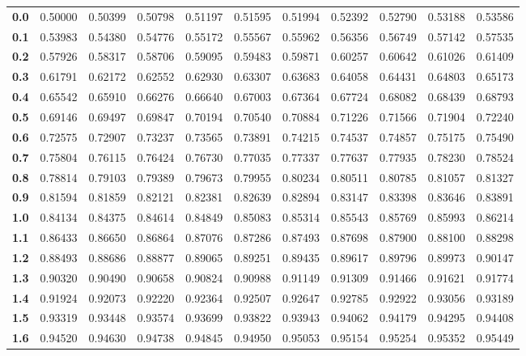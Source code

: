 \documentclass[12pt,a4paper]{article}
\begin{document}
\begin{enumerate}
\begin{center}
\begin{longtable}{c | cccccccccc}
\bottomrule
\endlastfoot
\textbf{0.0} & 0.50000 & 0.50399 & 0.50798 & 0.51197 & 0.51595 & 0.51994 & 0.52392 & 0.52790 & 0.53188 & 0.53586 \\
\textbf{0.1} & 0.53983 & 0.54380 & 0.54776 & 0.55172 & 0.55567 & 0.55962 & 0.56356 & 0.56749 & 0.57142 & 0.57535 \\
\textbf{0.2} & 0.57926 & 0.58317 & 0.58706 & 0.59095 & 0.59483 & 0.59871 & 0.60257 & 0.60642 & 0.61026 & 0.61409 \\
\textbf{0.3} & 0.61791 & 0.62172 & 0.62552 & 0.62930 & 0.63307 & 0.63683 & 0.64058 & 0.64431 & 0.64803 & 0.65173 \\
\textbf{0.4} & 0.65542 & 0.65910 & 0.66276 & 0.66640 & 0.67003 & 0.67364 & 0.67724 & 0.68082 & 0.68439 & 0.68793 \\
\textbf{0.5} & 0.69146 & 0.69497 & 0.69847 & 0.70194 & 0.70540 & 0.70884 & 0.71226 & 0.71566 & 0.71904 & 0.72240 \\
\textbf{0.6} & 0.72575 & 0.72907 & 0.73237 & 0.73565 & 0.73891 & 0.74215 & 0.74537 & 0.74857 & 0.75175 & 0.75490 \\
\textbf{0.7} & 0.75804 & 0.76115 & 0.76424 & 0.76730 & 0.77035 & 0.77337 & 0.77637 & 0.77935 & 0.78230 & 0.78524 \\
\textbf{0.8} & 0.78814 & 0.79103 & 0.79389 & 0.79673 & 0.79955 & 0.80234 & 0.80511 & 0.80785 & 0.81057 & 0.81327 \\
\textbf{0.9} & 0.81594 & 0.81859 & 0.82121 & 0.82381 & 0.82639 & 0.82894 & 0.83147 & 0.83398 & 0.83646 & 0.83891 \\
\textbf{1.0} & 0.84134 & 0.84375 & 0.84614 & 0.84849 & 0.85083 & 0.85314 & 0.85543 & 0.85769 & 0.85993 & 0.86214 \\
\textbf{1.1} & 0.86433 & 0.86650 & 0.86864 & 0.87076 & 0.87286 & 0.87493 & 0.87698 & 0.87900 & 0.88100 & 0.88298 \\
\textbf{1.2} & 0.88493 & 0.88686 & 0.88877 & 0.89065 & 0.89251 & 0.89435 & 0.89617 & 0.89796 & 0.89973 & 0.90147 \\
\textbf{1.3} & 0.90320 & 0.90490 & 0.90658 & 0.90824 & 0.90988 & 0.91149 & 0.91309 & 0.91466 & 0.91621 & 0.91774 \\
\textbf{1.4} & 0.91924 & 0.92073 & 0.92220 & 0.92364 & 0.92507 & 0.92647 & 0.92785 & 0.92922 & 0.93056 & 0.93189 \\
\textbf{1.5} & 0.93319 & 0.93448 & 0.93574 & 0.93699 & 0.93822 & 0.93943 & 0.94062 & 0.94179 & 0.94295 & 0.94408 \\
\textbf{1.6} & 0.94520 & 0.94630 & 0.94738 & 0.94845 & 0.94950 & 0.95053 & 0.95154 & 0.95254 & 0.95352 & 0.95449 \\

\end{longtable}
\end{center}
\end{enumerate}
\end{document}
